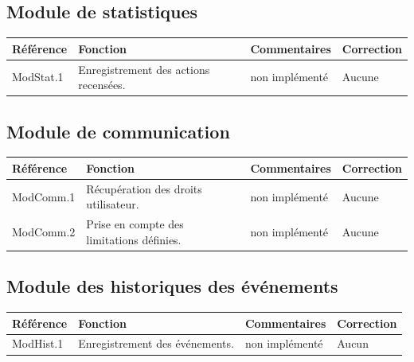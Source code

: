\documentclass[10pt,a4paper,landscape]{report}
\begin{document}
\subsection{Module de statistiques}

\begin{center}
	\bgroup
	\def\arraystretch{1.5}
	\begin{tabular}{|p{2.5cm}|p{8cm}|p{8cm}|p{8cm}|}
		\hline
		\rowcolor{gris}Référence & Fonction & Commentaires & Correction\\
		\hline
		ModStat.1 & Enregistrement des actions recensées. & non implémenté & Aucune \\
		\hline
	\end{tabular}
	\egroup
\end{center}


\subsection{Module de communication}

\begin{center}
	\bgroup
	\def\arraystretch{1.5}
	\begin{tabular}{|p{2.5cm}|p{8cm}|p{8cm}|p{8cm}|}
		\hline
		\rowcolor{gris}Référence & Fonction & Commentaires & Correction\\
		\hline
		ModComm.1 & Récupération des droits utilisateur. & non implémenté & Aucune \\
		\hline
		ModComm.2 & Prise en compte des limitations définies. & non implémenté & Aucune \\
		\hline
	\end{tabular}
	\egroup
\end{center}


\subsection{Module des historiques des événements}

\begin{center}
	\bgroup
	\def\arraystretch{1.5}
	\begin{tabular}{|p{2.5cm}|p{8cm}|p{8cm}|p{8cm}|}
		\hline
		\rowcolor{gris}Référence & Fonction & Commentaires & Correction\\
		\hline
		ModHist.1 & Enregistrement des événements. & non implémenté & Aucun \\
		\hline
	\end{tabular}
	\egroup
\end{center}
\end{document}
